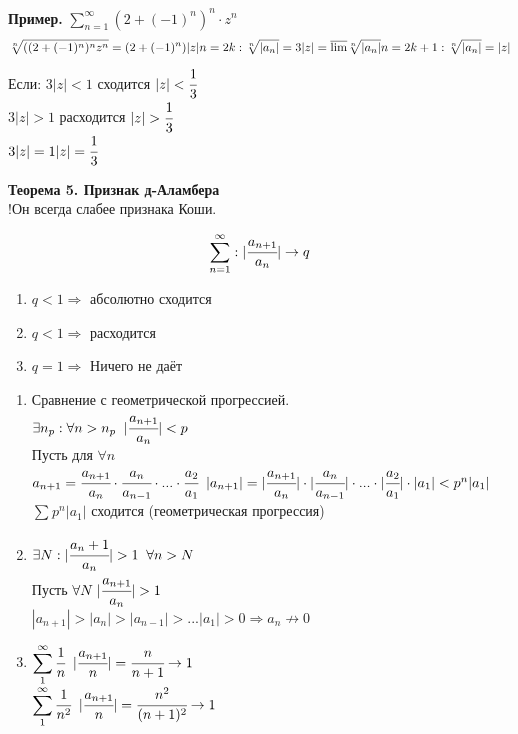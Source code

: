 \documentclass[12pt, paper]{article}
\begin{document}
\textbf{Пример.} $ \sum^\infty_{n=1} (2+(-1)^n)^n \cdot z^n$\\
\[
	\sqrt[n]{((2+(-1)^n)^n z^n} = (2+(-1)^n)|z|\\
	n = 2k: \sqrt[n]{|a_n|} = 3|z| = \overline{\lim} \sqrt[n]{|a_n|} \\
	n = 2k+1: \sqrt[n]{|a_n|} = |z|\\ 
\]
Если: 
	$3|z| < 1$ сходится $|z| < \cfrac{1}{3}$\\
	$3|z| > 1$ расходится $|z| > \cfrac{1}{3}$\\
	$3|z| = 1 |z| = \cfrac{1}{3} $

\textbf{Теорема 5. Признак д-Аламбера}\\
!Он всегда слабее признака Коши.
\begin{tcolorbox}
	\[
		\sum_{n=1}^{\infty}: |\cfrac{a_{n+1}}{a_{n}}| \to q
	\]
\begin{enumerate}
	\item $q < 1 \Rightarrow$ абсолютно сходится
	\item $q < 1 \Rightarrow$ расходится
	\item $q = 1 \Rightarrow$ Ничего не даёт
\end{enumerate}
\end{tcolorbox}

\begin{tcolorbox}[title=Доказательство.]
	\begin{enumerate}
		\item  Сравнение с геометрической прогрессией.\\
		$\exists n_p: \forall n > n_p \;\; |\cfrac{a_{n + 1}}{a_n}| < p$\\
		Пусть для $\forall n$\\
		$ a_{n+1} = \cfrac{a_{n+1}}{a_n} \cdot  \cfrac{a_{n}}{a_{n-1}} \cdot ... \cdot \cfrac{a_{2}}{a_1} $
		$ |a_{n+1}| = |\cfrac{a_{n+1}}{a_n}| \cdot  |\cfrac{a_{n}}{a_{n-1}}| \cdot ... \cdot |\cfrac{a_{2}}{a_1}| \cdot |a_1| < p^n |a_1| $\\
		$ \displaystyle\sum_{}^{} p^n |a_1|$ сходится (геометрическая прогрессия)
	\item $\exists N: |\cfrac{a{_n+1}}{a_n}| > 1\;\; \forall n > N$\\
		Пусть $ \forall N\; |\cfrac{a_{n+1}}{a_n}| > 1 $\\
		$ |a_{n+1}| > |a_{n}| > |a_{n-1}| > ... |a_{1}| > 0 \Rightarrow a_n \not\to 0$
	\item $ \displaystyle\sum_{1}^{\infty} \cfrac{1}{n}\;\; |\cfrac{a_{n+1}}{n}| = \cfrac{n}{n+1} \to 1$\\
		$ \displaystyle\sum_{1}^{\infty} \cfrac{1}{n^2}\;\; |\cfrac{a_{n+1}}{n}| = \cfrac{n^2}{(n+1)^2} \to 1$\\
 	\end{enumerate}
\end{tcolorbox}
\end{document}

